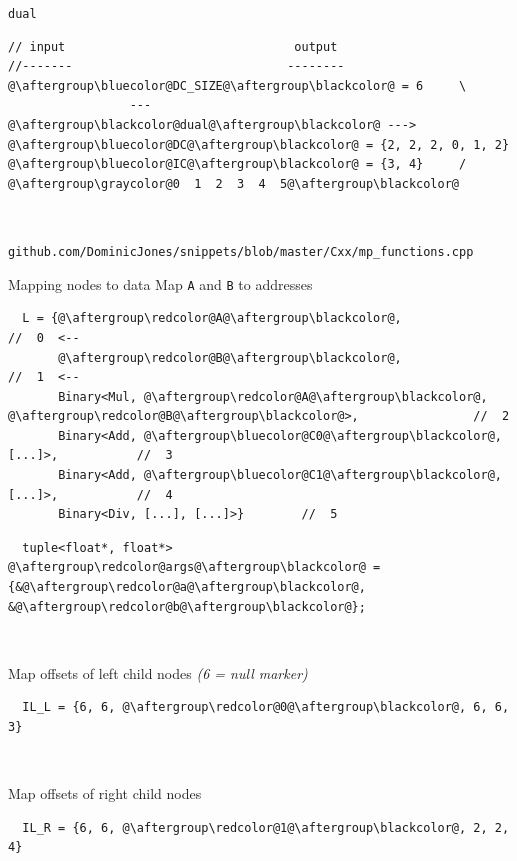 \documentclass[xcolor=dvipsnames]{beamer}
\begin{document}
\begin{frame}[fragile]{\texttt{dual}}
\begin{lstlisting}
// input                                output
//-------                              --------
@\aftergroup\bluecolor@DC_SIZE@\aftergroup\blackcolor@ = 6     \
                 --- @\aftergroup\blackcolor@dual@\aftergroup\blackcolor@ --->    @\aftergroup\bluecolor@DC@\aftergroup\blackcolor@ = {2, 2, 2, 0, 1, 2}
@\aftergroup\bluecolor@IC@\aftergroup\blackcolor@ = {3, 4}     /                       @\aftergroup\graycolor@0  1  2  3  4  5@\aftergroup\blackcolor@
\end{lstlisting}

~

\vspace{5mm}
\footnotesize{\texttt{github.com/DominicJones/snippets/blob/master/Cxx/mp\_functions.cpp}}
\end{frame}


\begin{frame}[fragile]{Mapping nodes to data}
Map {\color{red}\texttt{A}} and {\color{red}\texttt{B}} to addresses
\begin{lstlisting}
  L = {@\aftergroup\redcolor@A@\aftergroup\blackcolor@,                                //  0  <--
       @\aftergroup\redcolor@B@\aftergroup\blackcolor@,                                //  1  <--
       Binary<Mul, @\aftergroup\redcolor@A@\aftergroup\blackcolor@, @\aftergroup\redcolor@B@\aftergroup\blackcolor@>,                //  2
       Binary<Add, @\aftergroup\bluecolor@C0@\aftergroup\blackcolor@, [...]>,           //  3
       Binary<Add, @\aftergroup\bluecolor@C1@\aftergroup\blackcolor@, [...]>,           //  4
       Binary<Div, [...], [...]>}        //  5
\end{lstlisting}
\begin{lstlisting}
  tuple<float*, float*> @\aftergroup\redcolor@args@\aftergroup\blackcolor@ = {&@\aftergroup\redcolor@a@\aftergroup\blackcolor@, &@\aftergroup\redcolor@b@\aftergroup\blackcolor@};
\end{lstlisting}


~

Map offsets of left child nodes \emph{(6 = null marker)}
\begin{lstlisting}
  IL_L = {6, 6, @\aftergroup\redcolor@0@\aftergroup\blackcolor@, 6, 6, 3}
\end{lstlisting}

~

Map offsets of right child nodes
\begin{lstlisting}
  IL_R = {6, 6, @\aftergroup\redcolor@1@\aftergroup\blackcolor@, 2, 2, 4}
\end{lstlisting}
\end{frame}
\end{document}
